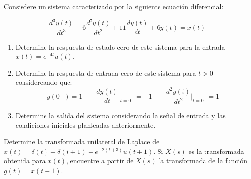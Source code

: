 \begin{ejercicio}
	Consisdere un sistema caracterizado por la siguiente ecuación diferencial:

	$$ \frac{d^3 y(t)}{dt^3} + 6 \frac{d^2 y(t)}{dt^2} + 11 \frac{dy(t)}{dt} + 6 y(t) = x(t) $$
	\begin{enumerate}
		\item Determine la respuesta de estado cero de este sistema para la entrada $x(t) = e^{-4t}u(t)$.
		\item Determine la respuesta de entrada cero de este sistema para $t>0^{-}$ considereando que:
			$$ y(0^{-}) = 1 \qquad \frac{dy(t)}{dt}\bigg\rvert_{t=0^-} = -1 \qquad \frac{d^{2}y(t)}{dt^2}\bigg\rvert_{t=0^-} = 1$$ 
		\item Determine la salida del sistema considerando la señal de entrada y las condiciones iniciales planteadas anteriormente.
	\end{enumerate}
\end{ejercicio}

\begin{ejercicio}
	Determine la transformada unilateral de Laplace de $x(t) = \delta(t) + \delta(t+1) + e^{-2(t+3)}u(t+1)$. Si $X(s)$ es la transformada obtenida para $x(t)$, encuentre a partir de $X(s)$ la transformada de la función $g(t) = x(t-1)$.
\end{ejercicio}
